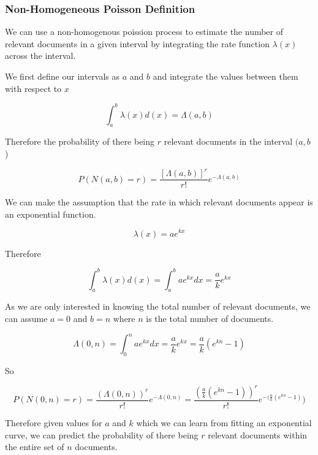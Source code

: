\subsubsection{Non-Homogeneous Poisson Definition} \label{nn_pp_def}

We can use a non-homogenous poission process to estimate the number of relevant documents in a given interval by integrating the rate function $\lambda(x)$ across the interval.

We first define our intervals as $a$ and $b$ and integrate the values between them with respect to $x$

\begin{equation}
	   \int_a^b \lambda(x) d(x) = \Lambda(a, b)
\end{equation}

Therefore the probability of there being $r$ relevant documents in the interval $(a, b$)

\begin{equation}
	   P(N(a, b) = r) = \frac{[\Lambda(a,b)]^r}{r!} e^{-\Lambda(a,b)}
\end{equation}

We can make the assumption that the rate in which relevant documents appear is an exponential function.

\begin{equation}
	   \lambda(x) = ae^{kx}
\end{equation}

Therefore

\begin{equation}
	   \int_a^b \lambda(x) d(x) = \int_a^b ae^{kx} dx = \frac{a}{k}e^{kx}
\end{equation}

As we are only interested in knowing the total number of relevant documents, we can assume $a=0$ and $b=n$ where $n$ is the total number of documents.

\begin{equation}
	   \Lambda(0, n) = \int_0^n ae^{kx}dx = \frac{a}{k}e^{kx} = \frac{a}{k}(e^{kn} - 1)
\end{equation}

So

\begin{equation}
	   P(N(0,n) = r) = \frac{(\Lambda(0,n))^r}{r!}e^{-\Lambda(0,n)} = \frac{\left(\frac{a}{k}(e^{kn} -1)\right)^r}{r!} e^{-(\frac{a}{k}(e^{kn} - 1)})
\end{equation}

Therefore given values for $a$ and $k$ which we can learn from fitting an exponential curve, we can predict the probability of there being $r$ relevant documents within the entire set of $n$ documents.


